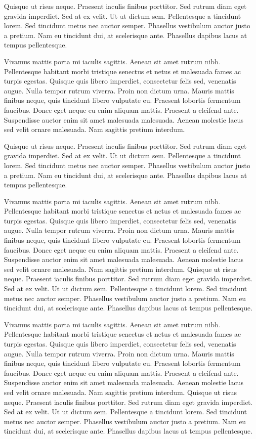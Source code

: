 Quisque ut risus neque. Praesent iaculis finibus porttitor. Sed rutrum diam eget gravida imperdiet. Sed at ex velit. Ut ut dictum sem. Pellentesque a tincidunt lorem. Sed tincidunt metus nec auctor semper. Phasellus vestibulum auctor justo a pretium. Nam eu tincidunt dui, at scelerisque ante. Phasellus dapibus lacus at tempus pellentesque.

Vivamus mattis porta mi iaculis sagittis. Aenean sit amet rutrum nibh. Pellentesque habitant morbi tristique senectus et netus et malesuada fames ac turpis egestas. Quisque quis libero imperdiet, consectetur felis sed, venenatis augue. Nulla tempor rutrum viverra. Proin non dictum urna. Mauris mattis finibus neque, quis tincidunt libero vulputate eu. Praesent lobortis fermentum faucibus. Donec eget neque eu enim aliquam mattis. Praesent a eleifend ante. Suspendisse auctor enim sit amet malesuada malesuada. Aenean molestie lacus sed velit ornare malesuada. Nam sagittis pretium interdum.

Quisque ut risus neque. Praesent iaculis finibus porttitor. Sed rutrum diam eget gravida imperdiet. Sed at ex velit. Ut ut dictum sem. Pellentesque a tincidunt lorem. Sed tincidunt metus nec auctor semper. Phasellus vestibulum auctor justo a pretium. Nam eu tincidunt dui, at scelerisque ante. Phasellus dapibus lacus at tempus pellentesque.

Vivamus mattis porta mi iaculis sagittis. Aenean sit amet rutrum nibh. Pellentesque habitant morbi tristique senectus et netus et malesuada fames ac turpis egestas. Quisque quis libero imperdiet, consectetur felis sed, venenatis augue. Nulla tempor rutrum viverra. Proin non dictum urna. Mauris mattis finibus neque, quis tincidunt libero vulputate eu. Praesent lobortis fermentum faucibus. Donec eget neque eu enim aliquam mattis. Praesent a eleifend ante. Suspendisse auctor enim sit amet malesuada malesuada. Aenean molestie lacus sed velit ornare malesuada. Nam sagittis pretium interdum.
Quisque ut risus neque. Praesent iaculis finibus porttitor. Sed rutrum diam eget gravida imperdiet. Sed at ex velit. Ut ut dictum sem. Pellentesque a tincidunt lorem. Sed tincidunt metus nec auctor semper. Phasellus vestibulum auctor justo a pretium. Nam eu tincidunt dui, at scelerisque ante. Phasellus dapibus lacus at tempus pellentesque.

Vivamus mattis porta mi iaculis sagittis. Aenean sit amet rutrum nibh. Pellentesque habitant morbi tristique senectus et netus et malesuada fames ac turpis egestas. Quisque quis libero imperdiet, consectetur felis sed, venenatis augue. Nulla tempor rutrum viverra. Proin non dictum urna. Mauris mattis finibus neque, quis tincidunt libero vulputate eu. Praesent lobortis fermentum faucibus. Donec eget neque eu enim aliquam mattis. Praesent a eleifend ante. Suspendisse auctor enim sit amet malesuada malesuada. Aenean molestie lacus sed velit ornare malesuada. Nam sagittis pretium interdum.
Quisque ut risus neque. Praesent iaculis finibus porttitor. Sed rutrum diam eget gravida imperdiet. Sed at ex velit. Ut ut dictum sem. Pellentesque a tincidunt lorem. Sed tincidunt metus nec auctor semper. Phasellus vestibulum auctor justo a pretium. Nam eu tincidunt dui, at scelerisque ante. Phasellus dapibus lacus at tempus pellentesque.

